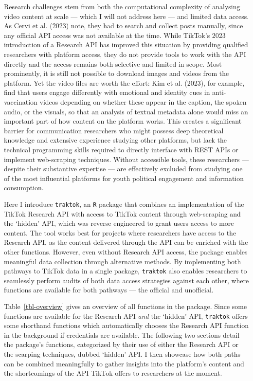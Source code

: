 \documentclass[
  nobib]{ccr}
\begin{document}
Research challenges stem from both the computational complexity of
analysing video content at scale --- which I will not address here ---
and limited data access. As Cervi et al. (2023) note, they had to search
and collect posts manually, since any official API access was not
available at the time. While TikTok's 2023 introduction of a Research
API has improved this situation by providing qualified researchers with
platform access, they do not provide tools to work with the API directly
and the access remains both selective and limited in scope. Most
prominently, it is still not possible to download images and videos from
the platform. Yet the video files are worth the effort: Kim et al.
(2023), for example, find that users engage differently with emotional
and identity cues in anti-vaccination videos depending on whether these
appear in the caption, the spoken audio, or the visuals, so that an
analysis of textual metadata alone would miss an important part of how
content on the platform works. This creates a significant barrier for
communication researchers who might possess deep theoretical knowledge
and extensive experience studying other platforms, but lack the
technical programming skills required to directly interface with REST
APIs or implement web-scraping techniques. Without accessible tools,
these researchers --- despite their substantive expertise --- are
effectively excluded from studying one of the most influential platforms
for youth political engagement and information consumption.

Here I introduce \texttt{traktok}, an \texttt{R} package that combines
an implementation of the TikTok Research API with access to TikTok
content through web-scraping and the `hidden' API, which was reverse
engineered to grant users access to more content. The tool works best
for projects where researchers have access to the Research API, as the
content delivered through the API can be enriched with the other
functions. However, even without Research API access, the package
enables meaningful data collection through alternative methods. By
implementing both pathways to TikTok data in a single package,
\texttt{traktok} also enables researchers to seamlessly perform audits
of both data access strategies against each other, where functions are
available for both pathways --- the official and unofficial.

Table~\ref{tbl-overview} gives an overview of all functions in the
package. Since some functions are available for the Research API
\emph{and} the `hidden' API, \texttt{traktok} offers some shorthand
functions which automatically chooses the Research API function in the
background if credentials are available. The following two sections
detail the package's functions, categorized by their use of either the
Research API or the scarping techniques, dubbed `hidden' API. I then
showcase how both paths can be combined meaningfully to gather insights
into the platform's content and the shortcomings of the API TikTok
offers to researchers at the moment.
\end{document}
